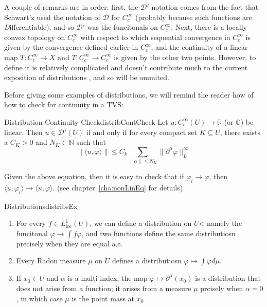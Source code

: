 \documentclass{book}
\newenvironment{Proof}[1][]
  {\begin{ProofTcb}[#1]}
  {\end{ProofTcb}}
\newcommand{\N}{{\mathbb{N}}}
\newcommand{\R}{{\mathbb{R}}}
\newcommand{\C}{{\mathbb{C}}}
\newcommand{\CD}{{\mathcal{D}}}
\newcommand{\sse}{\subseteq}
\renewcommand{\phi}{\varphi}
\newcommand{\rw}{\rightarrow}
\begin{document}
A couple of remarks are in order: first, the $\CD'$ notation comes from the fact that Schwart'z used the notation of
$\CD$ for $C_c^\infty$ (probably because such functions are \emph{D}ifferentiable), and so $\CD'$ was the funcitonals on $C_c^\infty$. Next, there is a locally convex topology on
$C_c^\infty$ with respect to which sequential convergence in $C_c^\infty$ is given by the convergence defined earlier in
$C_c^\infty$, and the continuity of a linear map $T: C_c^\infty \rw X$ and $T: C_c^\infty \rw C_c^\infty$ is given by
the other two points. However, to define it is relatively complicated and doesn't contribute much to the current
exposition of distributions , and so will be ommited.

Before giving some examples of distributions, we will remind the reader how of how to check for continuity in a TVS:

\begin{prop}{Distribution Continuity Check}{distribContCheck}
	Let $u: C_c^\infty(U) \rw \R$ (or $\C$) be linear. Then $u \in \CD'(U)$ if and only if for every compact set $K \sse
	U$, there exists a $C_K > 0$ and $N_K \in\N$ such that
	\[
		\| \langle u, \phi\rangle\| \le C_k \sum_{\|\alpha\| \le N_K} \|  \partial^\alpha \phi\|_L^\infty
	\]
\end{prop}

\begin{Proof}
	Given the above equation, then it is easy to check  that if $\phi_i
	\rw \phi$, then $\langle u, \phi_i\rangle \rw \langle u, \phi\rangle$. (see chapter~\ref{cha:nonLinEq} for details)
\end{Proof}

\begin{example}{Distributions}{distribsEx}
	\begin{enumerate}
		\item For every $f \in L_{\text{loc}}^1(U)$, we can define a distribution on $U$< namely the funcitonal $\phi
			\rw \int f\phi$, and two functions define the same distributiosn precisely when they are equal a.e.
		\item Every Radon measure $\mu$ on $U$ defines a distributiosn $\phi \mapsto \int \phi d\mu$.
		\item If $x_0 \in U$ and $\alpha$ is a multi-index, the map $\phi \mapsto  \partial^\alpha(x_0)$ is
			a distribution that does not arise from a function; it arises from a measure $\mu$ prcisely when $\alpha
			= 0$, in which case $\mu$ is the point mass at $x_0$
		\end{enumerate}
\end{example}
\end{document}
